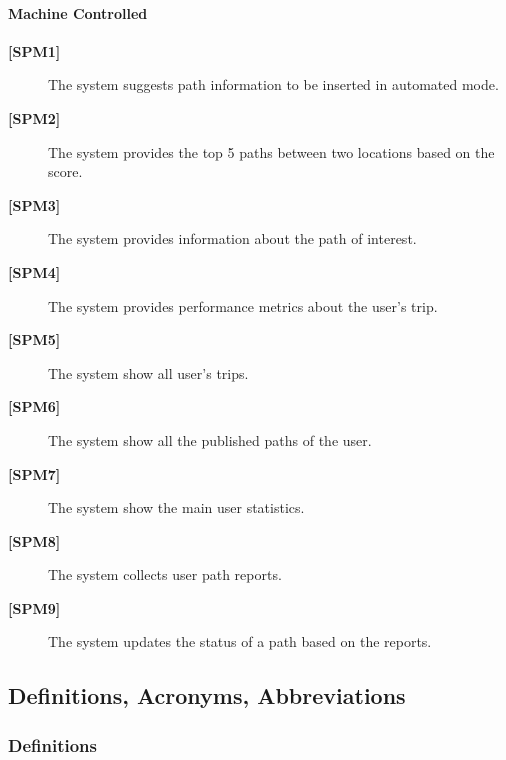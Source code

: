 \paragraph{Machine Controlled}
\begin{description}
    \item[\textbf{[SPM1]}] The system suggests path information to be inserted in automated mode. 

    \item[\textbf{[SPM2]}] The system provides the top 5 paths between two locations based on the score.

    \item[\textbf{[SPM3]}] The system provides information about the path of interest.

    \item[\textbf{[SPM4]}] The system provides performance metrics about the user’s trip.

    \item[\textbf{[SPM5]}] The system show all user's trips. 

    \item[\textbf{[SPM6]}] The system show all the published paths of the user.

    \item[\textbf{[SPM7]}] The system show the main user statistics. 

    \item[\textbf{[SPM8]}] The system collects user path reports.

    \item[\textbf{[SPM9]}] The system updates the status of a path based on the reports.
\end{description}
\subsection{Definitions, Acronyms, Abbreviations}
\subsubsection{Definitions}

